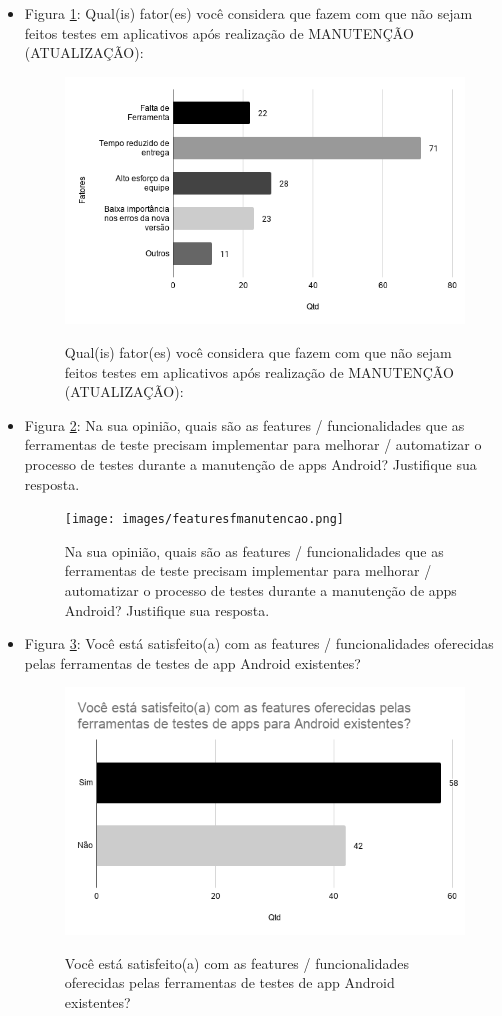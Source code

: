 \begin{itemize}
    
    \item Figura \ref{figure:s_fatorestestemanutencao}: Qual(is) fator(es) você considera que fazem com que não sejam feitos testes em aplicativos após realização de MANUTENÇÃO (ATUALIZAÇÃO):
    \begin{figure}[!htb]
    \centering
    \includegraphics[width=.55\textwidth]{images/s_fatorestestemanutencao.png}
    \label{figure:s_fatorestestemanutencao}
    \caption{Qual(is) fator(es) você considera que fazem com que não sejam feitos testes em aplicativos após realização de MANUTENÇÃO (ATUALIZAÇÃO):}
    \end{figure}
    

    \item Figura \ref{figure:s_featuresfmanutencao}: Na sua opinião, quais são as features / funcionalidades que as ferramentas de teste precisam implementar para melhorar / automatizar o processo de testes  durante a manutenção de apps Android? Justifique sua resposta.
    \begin{figure}[!htb]
    \centering
    \texttt{[image: images/featuresfmanutencao.png]}
    \label{figure:s_featuresfmanutencao}
    \caption{Na sua opinião, quais são as features / funcionalidades que as ferramentas de teste precisam implementar para melhorar / automatizar o processo de testes  durante a manutenção de apps Android? Justifique sua resposta.}
    \end{figure}   
    
    
    \item Figura \ref{figure:s_featuresexistentes}: Você está satisfeito(a) com as features  / funcionalidades oferecidas pelas ferramentas de testes de app Android existentes?
    \begin{figure}[!htb]
    \centering
    \includegraphics[width=.55\textwidth]{images/s_featuresexistentes.png}
    \label{figure:s_featuresexistentes}
    \caption{Você está satisfeito(a) com as features  / funcionalidades oferecidas pelas ferramentas de testes de app Android existentes?}
    \end{figure}



\end{itemize}
